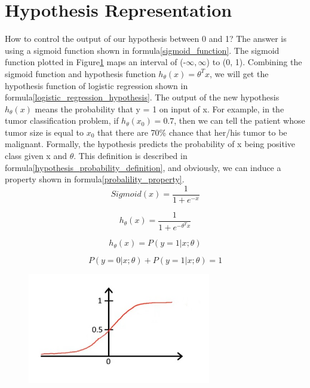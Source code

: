 \documentclass{article}
\begin{document}
\section{Hypothesis Representation}
How to control the output of our hypothesis between 0 and 1? The answer is using a sigmoid function shown in formula\ref{sigmoid_function}. The sigmoid function plotted in Figure\ref{sigmoid_function_plotting} maps an interval of (-$\infty, \infty$) to (0, 1). Combining the sigmoid function and hypothesis function $h_{\theta}(x) = \theta^{T}x$, we will get the hypothesis function of logistic regression shown in formula\ref{logistic_regression_hypothesis}. The output of the new hypothesis $h_{\theta}(x)$  means the probability that y = 1 on input of x. For example, in the tumor classification problem, if $h_{\theta}(x_{0}) = 0.7$, then we can tell the patient whose tumor size is equal to $x_{0}$ that there are 70\% chance that her/his tumor to be malignant. Formally, the hypothesis predicts the probability of x being positive class given x and $\theta$. This definition is described in formula\ref{hypothesis_probability_definition}, and obviously, we can induce a property shown in formula\ref{probalility_property}.
\begin{equation}\label{sigmoid_function}
Sigmoid(x) = \frac{1}{1 + e^{-x}}
\end{equation}

\begin{equation}\label{logistic_regression_hypothesis}
h_{\theta}(x) = \frac{1}{1 + e^{-\theta^{T}x}}
\end{equation}

\begin{equation}\label{hypothesis_probability_definition}
h_{\theta}(x) = P(y = 1|x;\theta)
\end{equation}

\begin{equation}\label{probalility_property}
P(y = 0|x;\theta) + P(y = 1|x;\theta) = 1
\end{equation}

\begin{figure}[ht]
  \centering
  \includegraphics[width=8cm]{Figure2.jpg}\\
  \caption{}\label{sigmoid_function_plotting}
\end{figure}
\end{document}
